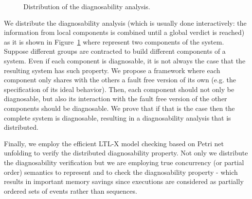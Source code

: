 \documentclass[a4paper]{article}
\begin{document}
\begin{figure}[h]
{\def\soledge[#1,#2,#3,#4];{
        \draw[dashed,-latex,#4] (#1) -- #3 (#2);
}

   }
  \caption{Distribution of the diagnosability analysis.}
  \label{fig:motivation}
\end{figure}

We distribute the diagnosability analysis (which is usually done interactively: the information from local components is combined until a global verdict is reached) as it is shown in Figure~\ref{fig:motivation} where  represent two components of the system. Suppose different groups are contracted to build different components of a system. Even if each component is diagnosable, it is not always the case that the resulting system has such property. We propose a framework where each component only shares with the others a fault free version of its own (e.g. the specification of its ideal behavior). Then, each component should not only be diagnosable, but also its interaction with the fault free version of the other components should be diagnosable. We prove that if that is the case then the complete system is diagnosable, resulting in a diagnosability analysis that is distributed.

Finally, we employ the efficient LTL-X model checking based on Petri net unfolding to verify the distributed diagnosability property. Not only we distribute the diagnosability verification but we are employing true concurrency (or partial order) semantics to represent and to check the diagnosability property - which results in important memory savings since executions are considered as partially ordered sets of events rather than sequences.
\end{document}
